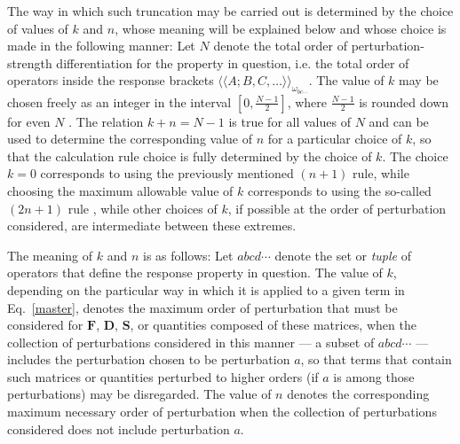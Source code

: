 \documentclass[%
 reprint,
 amsmath,amssymb,
 aps,
]{revtex4-1}
\begin{document}
The way in which such truncation may be carried out is determined by the choice
of values of $k$ and $n$, whose meaning will be explained below and whose
choice is made in the following manner: Let $N$ denote the total order of
perturbation-strength differentiation for the property in question, i.e. the
total order of operators inside the response brackets $\langle \langle A ; B,
C, \ldots \rangle \rangle_{\omega_{bc\cdots}}$. The value of $k$ may be chosen
freely as an integer in the interval $\left[ 0, \frac{N - 1}{2} \right]$, where
$\frac{N - 1}{2}$ is rounded down for even $N$ .
The relation $k + n = N - 1$ is true for all values of $N$ and can be used to
determine the corresponding value of $n$ for a particular choice of $k$, so
that the calculation rule choice is fully determined by the choice of $k$. The
choice $k = 0$ corresponds to using the previously mentioned $(n + 1)$ rule,
while choosing the maximum allowable value of $k$ corresponds to using the
so-called $(2n + 1)$ rule , while other choices of $k$, if possible
at the order of perturbation considered, are intermediate between these
extremes.

The meaning of $k$ and $n$ is as follows: Let $abcd\cdots$ denote the set or
\textit{tuple} of operators that define the response property in question. The
value of $k$, depending on the particular way in which it is applied to a given
term in Eq.~\eqref{master}, denotes the maximum order of perturbation that must
be considered for $\mathbf{F}$, $\mathbf{D}$, $\mathbf{S}$, or quantities
composed of these matrices, when the collection of perturbations considered in
this manner --- a subset of $abcd\cdots$ --- includes the perturbation chosen
to be perturbation $a$, so that terms that contain such matrices or quantities
perturbed to higher orders (if $a$ is among those perturbations) may be
disregarded. The value of $n$ denotes the corresponding maximum necessary order
of perturbation when the collection of perturbations considered does not
include perturbation $a$.
\end{document}
